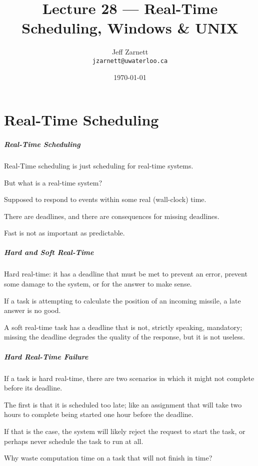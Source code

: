 

\title{Lecture 28 --- Real-Time Scheduling, Windows \& UNIX}

\author{Jeff Zarnett \\ \small \texttt{jzarnett@uwaterloo.ca}}
\date{\today}




\begin{frame}
  \titlepage

 \end{frame}

\part{Real-Time Scheduling}

\begin{frame}
\partpage
\end{frame}

\begin{frame}
\frametitle{Real-Time Scheduling}

Real-Time scheduling is just scheduling for real-time systems.

But what is a real-time system?

Supposed to respond to events within some real (wall-clock) time. 

There are deadlines, and there are consequences for missing deadlines. 

Fast is not as important as predictable.

\end{frame}

\begin{frame}
\frametitle{Hard and Soft Real-Time}

\alert{Hard real-time}: it has a deadline that must be met to prevent an error, prevent some damage to the system, or for the answer to make sense. 

If a task is attempting to calculate the position of an incoming missile, a late answer is no good. 

A \alert{soft real-time} task has a deadline that is not, strictly speaking, mandatory; missing the deadline degrades the quality of the response, but it is not useless.


\end{frame}

\begin{frame}
\frametitle{Hard Real-Time Failure}

If a task is hard real-time, there are two scenarios in which it might not complete before its deadline. 

The first is that it is scheduled too late; like an assignment that will take two hours to complete being started one hour before the deadline. 

If that is the case, the system will likely reject the request to start the task, or perhaps never schedule the task to run at all. 

Why waste computation time on a task that will not finish in time? 

\end{frame}

